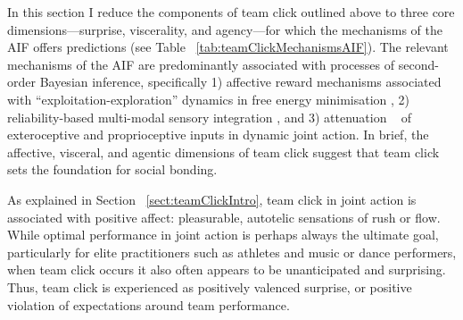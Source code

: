\begin{CJK}{UTF8}{gbsn}



In this section I reduce the components of team click outlined above to three core dimensions---surprise, viscerality, and agency---for which the mechanisms of the AIF offers predictions (see Table ~\ref{tab:teamClickMechanismsAIF}).  The relevant mechanisms of the AIF are predominantly associated with processes of second-order Bayesian inference, specifically 1) affective reward mechanisms associated with ``exploitation-exploration'' dynamics in free energy minimisation \citep{Friston2012,Schwartenbeck2013,FitzGerald2014,Chetverikov2016}, 2) reliability-based multi-modal sensory integration \citep{Ernst2004}, and 3) attenuation ~\citep{Frith2007,Friston2015} of exteroceptive and proprioceptive inputs in dynamic joint action.  In brief, the affective, visceral, and agentic dimensions of team click suggest that team click sets the foundation for social bonding.



As explained in Section ~\ref{sect:teamClickIntro}, team click in joint action is associated with positive affect: pleasurable, autotelic sensations of rush or flow.  While optimal performance in joint action is perhaps always the ultimate goal, particularly for elite practitioners such as athletes and music or dance performers, when team click occurs it also often appears to be unanticipated and surprising.  Thus, team click is experienced as positively valenced surprise, or positive violation of expectations around team performance.


\end{CJK}
